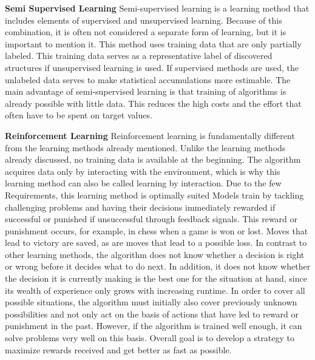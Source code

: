 \textbf{Semi Supervised Learning}
Semi-supervised learning is a learning method that includes elements of supervised
and unsupervised learning.
Because of this combination, it is often not considered a separate form of learning,
but it is important to mention it. This method uses training data that are only partially labeled.\cite[98]{schacht2019blockchain}
This training data serves as a representative label of discovered structures if unsupervised learning is used.
If supervised methods are used, the unlabeled data serves to make statistical accumulations more estimable.
The main advantage of semi-supervised learning is that
training of algorithms is already possible with little data.
This reduces the high costs and the effort that often have to be spent on target values.\cite{WuttkeDatasolutMachine}

\textbf{Reinforcement Learning}
Reinforcement learning is fundamentally different from the learning methods already mentioned.
Unlike the learning methods already discussed, no training data is available at the beginning.\cite[351]{Ertel2021}
The algorithm acquires data only by interacting with the environment,
which is why this learning method can also be called learning by interaction.
Due to the few Requirements, this learning method is optimally suited\cite[98]{schacht2019blockchain}
Models train by tackling challenging problems and having their decisions immediately rewarded
if successful or punished if unsuccessful through feedback signals.
This reward or punishment occurs, for example, in chess when a game is won or lost.
Moves that lead to victory are saved, as are moves that lead to a possible loss.\cite[98]{schacht2019blockchain}
In contrast to other learning methods, the algorithm does not know whether a decision is right or
wrong before it decides what to do next.
In addition, it does not know whether the decision it is currently making is the best one for the situation at hand,
since its wealth of experience only grows with increasing runtime. In order to cover all possible situations,
the algorithm must initially also cover previously unknown possibilities and not only act on the basis of actions
that have led to reward or punishment in the past.
However, if the algorithm is trained well enough, it can solve problems very well on this basis.
Overall goal is to develop a strategy to maximize rewards received and get better as fast as possible.\cite[351]{Ertel2021}